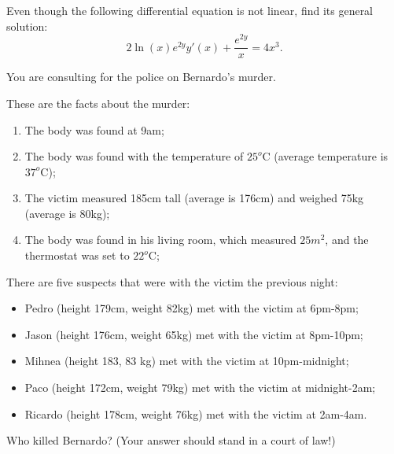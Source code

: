 \begin{exercises}
\begin{problist}
	\prob Even though the following differential equation is not linear, find its general solution:
		$$ 2 \ln(x) e^{2y} y'(x) + \frac{e^{2y}}{x} = 4x^3.$$

	\prob You are consulting for the police on Bernardo's murder.

		These are the facts about the murder:
		\begin{enumerate}
		\item The body was found at 9am;
		\item The body was found with the temperature of $25^o$C (average temperature is $37^o$C);
		\item The victim measured 185cm tall (average is 176cm) and weighed 75kg (average is 80kg);
		\item The body was found in his living room, which measured $25m^2$, and the thermostat was set to $22^o$C;
		\end{enumerate}
		
		There are five suspects that were with the victim the previous night:
		\begin{itemize}
		\item Pedro (height 179cm, weight 82kg) met with the victim at 6pm-8pm;
		\item Jason (height 176cm, weight 65kg) met with the victim at 8pm-10pm;
		\item Mihnea (height 183, 83 kg) met with the victim at 10pm-midnight;
		\item Paco (height 172cm, weight 79kg) met with the victim at midnight-2am;
		\item Ricardo (height 178cm, weight 76kg) met with the victim at 2am-4am.
		\end{itemize}
		
		
		Who killed Bernardo? (Your answer should stand in a court of law!)
	\end{problist}
\end{exercises}
